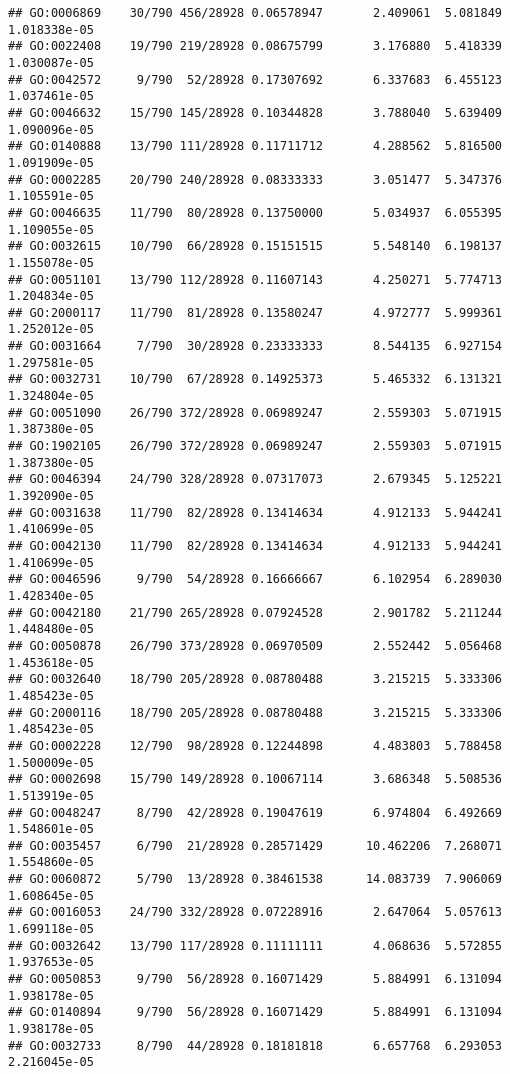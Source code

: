 \documentclass[
]{article}
\begin{document}
\begin{verbatim}
## GO:0006869    30/790 456/28928 0.06578947       2.409061  5.081849 1.018338e-05
## GO:0022408    19/790 219/28928 0.08675799       3.176880  5.418339 1.030087e-05
## GO:0042572     9/790  52/28928 0.17307692       6.337683  6.455123 1.037461e-05
## GO:0046632    15/790 145/28928 0.10344828       3.788040  5.639409 1.090096e-05
## GO:0140888    13/790 111/28928 0.11711712       4.288562  5.816500 1.091909e-05
## GO:0002285    20/790 240/28928 0.08333333       3.051477  5.347376 1.105591e-05
## GO:0046635    11/790  80/28928 0.13750000       5.034937  6.055395 1.109055e-05
## GO:0032615    10/790  66/28928 0.15151515       5.548140  6.198137 1.155078e-05
## GO:0051101    13/790 112/28928 0.11607143       4.250271  5.774713 1.204834e-05
## GO:2000117    11/790  81/28928 0.13580247       4.972777  5.999361 1.252012e-05
## GO:0031664     7/790  30/28928 0.23333333       8.544135  6.927154 1.297581e-05
## GO:0032731    10/790  67/28928 0.14925373       5.465332  6.131321 1.324804e-05
## GO:0051090    26/790 372/28928 0.06989247       2.559303  5.071915 1.387380e-05
## GO:1902105    26/790 372/28928 0.06989247       2.559303  5.071915 1.387380e-05
## GO:0046394    24/790 328/28928 0.07317073       2.679345  5.125221 1.392090e-05
## GO:0031638    11/790  82/28928 0.13414634       4.912133  5.944241 1.410699e-05
## GO:0042130    11/790  82/28928 0.13414634       4.912133  5.944241 1.410699e-05
## GO:0046596     9/790  54/28928 0.16666667       6.102954  6.289030 1.428340e-05
## GO:0042180    21/790 265/28928 0.07924528       2.901782  5.211244 1.448480e-05
## GO:0050878    26/790 373/28928 0.06970509       2.552442  5.056468 1.453618e-05
## GO:0032640    18/790 205/28928 0.08780488       3.215215  5.333306 1.485423e-05
## GO:2000116    18/790 205/28928 0.08780488       3.215215  5.333306 1.485423e-05
## GO:0002228    12/790  98/28928 0.12244898       4.483803  5.788458 1.500009e-05
## GO:0002698    15/790 149/28928 0.10067114       3.686348  5.508536 1.513919e-05
## GO:0048247     8/790  42/28928 0.19047619       6.974804  6.492669 1.548601e-05
## GO:0035457     6/790  21/28928 0.28571429      10.462206  7.268071 1.554860e-05
## GO:0060872     5/790  13/28928 0.38461538      14.083739  7.906069 1.608645e-05
## GO:0016053    24/790 332/28928 0.07228916       2.647064  5.057613 1.699118e-05
## GO:0032642    13/790 117/28928 0.11111111       4.068636  5.572855 1.937653e-05
## GO:0050853     9/790  56/28928 0.16071429       5.884991  6.131094 1.938178e-05
## GO:0140894     9/790  56/28928 0.16071429       5.884991  6.131094 1.938178e-05
## GO:0032733     8/790  44/28928 0.18181818       6.657768  6.293053 2.216045e-05

\end{verbatim}
\end{document}
